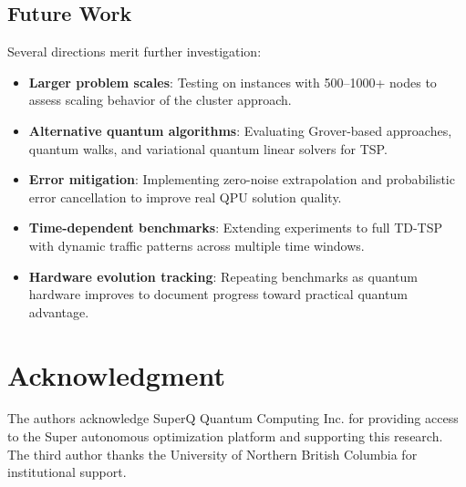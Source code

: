 \documentclass[conference]{IEEEtran}
\begin{document}
\subsection{Future Work}

Several directions merit further investigation:
\begin{itemize}
\item \textbf{Larger problem scales}: Testing on instances with 500--1000+ nodes to assess scaling behavior of the cluster approach.
\item \textbf{Alternative quantum algorithms}: Evaluating Grover-based approaches, quantum walks, and variational quantum linear solvers for TSP.
\item \textbf{Error mitigation}: Implementing zero-noise extrapolation and probabilistic error cancellation to improve real QPU solution quality.
\item \textbf{Time-dependent benchmarks}: Extending experiments to full TD-TSP with dynamic traffic patterns across multiple time windows.
\item \textbf{Hardware evolution tracking}: Repeating benchmarks as quantum hardware improves to document progress toward practical quantum advantage.
\end{itemize}


\section*{Acknowledgment}

The authors acknowledge SuperQ Quantum Computing Inc. for providing access to the Super autonomous optimization platform and supporting this research. The third author thanks the University of Northern British Columbia for institutional support.
\end{document}
